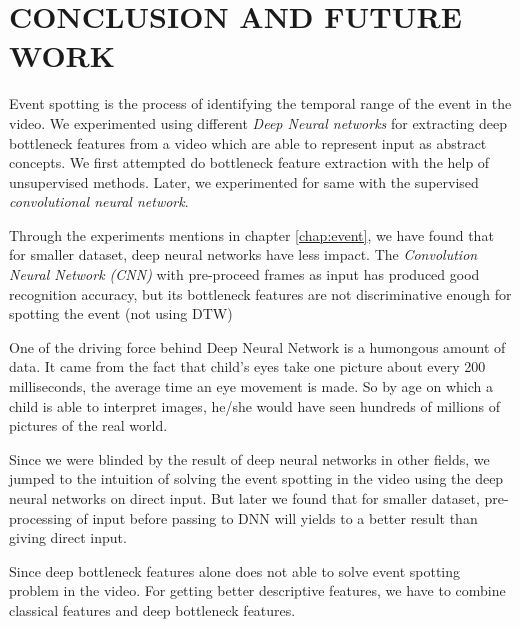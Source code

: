 \chapter{CONCLUSION AND FUTURE WORK} 
\label{chap:concl}
Event spotting is the process of identifying the temporal range of the event in the video. We experimented using  different \textit{Deep Neural networks} for extracting deep bottleneck features from a video which are able to represent input as abstract concepts. We first attempted do bottleneck feature extraction with the help of unsupervised methods. Later, we experimented for same with the supervised \textit{convolutional neural network}.

Through the experiments mentions in chapter \ref{chap:event}, we have found that for smaller dataset, deep neural networks have less impact.  The \textit{Convolution Neural Network (CNN)} with pre-proceed frames as input has produced good recognition accuracy, but its bottleneck features are not discriminative enough for spotting the event (not using DTW)

One of the driving force behind Deep Neural Network is a humongous amount of data. It came from the fact that child's eyes take one picture about every 200 milliseconds, the average time an eye movement is made. So by age on which a child  is able to interpret images, he/she would have seen hundreds of millions of pictures of the real world. 

Since we were blinded by the result of deep neural networks in other fields, we jumped to the intuition of solving  the event spotting in the video using the deep neural networks on direct input. But later we found that for smaller dataset, pre-processing of input before passing to DNN will yields to a better result than giving direct input.

Since deep bottleneck features alone does not able to solve event spotting problem in the video. For getting better descriptive features, we have to combine classical features and deep bottleneck features.  


